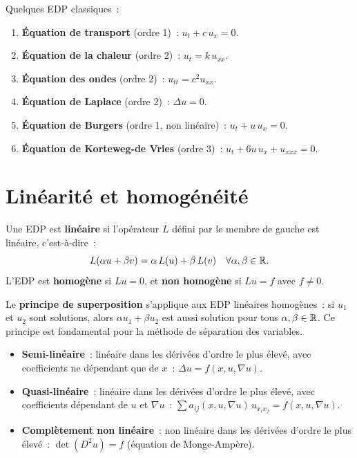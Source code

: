 \begin{exemple}
Quelques EDP classiques~:
\begin{enumerate}
    \item \textbf{\'Equation de transport} (ordre 1)~: $u_t + c\, u_x = 0$.
    \item \textbf{\'Equation de la chaleur} (ordre 2)~: $u_t = k\, u_{xx}$.
    \item \textbf{\'Equation des ondes} (ordre 2)~: $u_{tt} = c^2 u_{xx}$.
    \item \textbf{\'Equation de Laplace} (ordre 2)~: $\Delta u = 0$.
    \item \textbf{\'Equation de Burgers} (ordre 1, non lin\'eaire)~:
          $u_t + u\, u_x = 0$.
    \item \textbf{\'Equation de Korteweg-de Vries} (ordre 3)~:
          $u_t + 6u\, u_x + u_{xxx} = 0$.
\end{enumerate}
\end{exemple}

\section{Lin\'earit\'e et homog\'en\'eit\'e}

\begin{definition}
Une EDP est \textbf{lin\'eaire} si l'op\'erateur $L$ d\'efini par le membre de
gauche est lin\'eaire, c'est-\`a-dire~:
\[
    L(\alpha u + \beta v) = \alpha\, L(u) + \beta\, L(v)
    \quad \forall \alpha, \beta \in \mathbb{R}.
\]
L'EDP est \textbf{homog\`ene} si $Lu = 0$, et \textbf{non homog\`ene} si
$Lu = f$ avec $f \neq 0$.
\end{definition}

\begin{remarque}
Le \textbf{principe de superposition} s'applique aux EDP lin\'eaires homog\`enes~:
si $u_1$ et $u_2$ sont solutions, alors $\alpha u_1 + \beta u_2$ est aussi solution
pour tous $\alpha, \beta \in \mathbb{R}$. Ce principe est fondamental pour la m\'ethode
de s\'eparation des variables.
\end{remarque}

\begin{definition}
\leavevmode
\begin{itemize}
    \item \textbf{Semi-lin\'eaire}~: lin\'eaire dans les d\'eriv\'ees d'ordre le
          plus \'elev\'e, avec coefficients ne d\'ependant que de $x$~:
          $\Delta u = f(x, u, \nabla u)$.
    \item \textbf{Quasi-lin\'eaire}~: lin\'eaire dans les d\'eriv\'ees d'ordre le
          plus \'elev\'e, avec coefficients d\'ependant de $u$ et $\nabla u$~:
          $\sum a_{ij}(x, u, \nabla u)\, u_{x_i x_j} = f(x, u, \nabla u)$.
    \item \textbf{Compl\`etement non lin\'eaire}~: non lin\'eaire dans les
          d\'eriv\'ees d'ordre le plus \'elev\'e~: $\det(D^2 u) = f$ (\'equation
          de Monge-Amp\`ere).
\end{itemize}
\end{definition}

